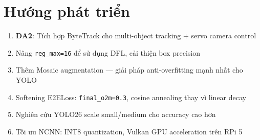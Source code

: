 \section{Hướng phát triển}

\begin{enumerate}
    \item \textbf{ĐA2}: Tích hợp ByteTrack cho multi-object tracking + servo camera control
    \item Nâng \texttt{reg\_max=16} để sử dụng DFL, cải thiện box precision
    \item Thêm Mosaic augmentation --- giải pháp anti-overfitting mạnh nhất cho YOLO
    \item Softening E2ELoss: \texttt{final\_o2m=0.3}, cosine annealing thay vì linear decay
    \item Nghiên cứu YOLO26 scale small/medium cho accuracy cao hơn
    \item Tối ưu NCNN: INT8 quantization, Vulkan GPU acceleration trên RPi 5
\end{enumerate}
